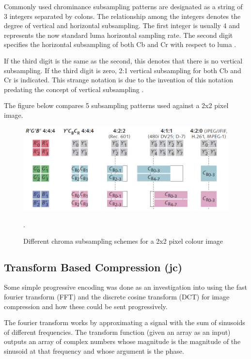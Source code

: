 Commonly used chrominance subsampling patterns are designated as 
a string of 3 integers separated by colons. 
The relationship among the integers denotes 
the degree of vertical and horizontal subsampling.
The first integer is usually 4 and represents the 
now standard luma horizontal sampling rate. 
The second digit specifies the horizontal subsampling of 
both Cb and Cr with respect to luma \cite{poynton_chroma_subsampling}.

If the third digit is the same as the second,
this denotes that there is no vertical subsampling.
If the third digit is zero, 2:1 vertical subsampling
for both Cb and Cr is indicated. This strange notation
is due to the invention of this notation
predating the concept of vertical subsampling \cite{poynton_chroma_subsampling}.

The figure below compares 5 subsampling patterns used against a 2x2 pixel image.

\begin{figure}[!hbtp]
\begin{center}
\includegraphics[scale=0.5]{figures/chromasub.png} 
\end{center}
\caption{Different chroma subsampling schemes for a 2x2 pixel colour image} \cite{poynton_chroma_subsampling}.\label{chroma_examples}

\end{figure}

\subsection{Transform Based Compression (jc)}
\label{transfom_based}

Some simple progressive encoding was done as an investigation into using the fast fourier transform (FFT) and the discrete cosine transform (DCT) for image compression and how these could be sent progressively.

The fourier transform works by approximating a signal with the sum of sinusoids of different frequencies. The transform function (given an array as an input) outputs an array of complex numbers whose magnitude is the magnitude of the sinusoid at that frequency and whose argument is the phase.

